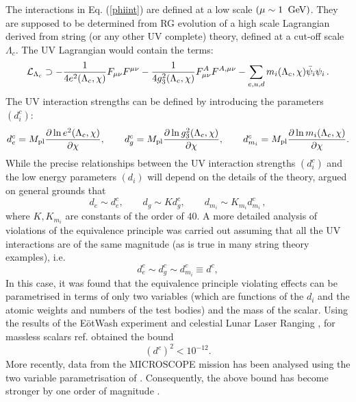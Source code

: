 \documentclass[11pt,a4paper]{article}
\newcommand{\be}{\begin{equation}}
\newcommand{\ee}{\end{equation}}
\def\pref#1{(\ref{#1})}
\begin{document}
The interactions in Eq. \pref{phiint} are defined at a low scale $(\mu \sim 1 \phantom{a} \rm{GeV})$. They are supposed to be
determined from RG evolution of a high scale Lagrangian derived from string (or any other UV complete) theory, defined at a cut-off scale $\Lambda_c$. The UV Lagrangian would contain the terms:
%
\begin{equation}
\label{UVLag}
   \mathcal{L}_{\Lambda_c} \supset   -  {1 \over  {4 e^2(\Lambda_c, \chi)}} F_{\mu \nu} F^{\mu \nu} - {1 \over  {4 g_3^2(\Lambda_c, \chi)}}  F_{\mu \nu}^{A} F^{A, \mu \nu}
   - \sum_{e,u,d}  m_i (\Lambda_c, \chi) \bar{\psi}_i \psi_i \,.   
\end{equation}
%
The UV interaction strengths can be defined by introducing the parameters $(d^c_{i})$:
%
\be
\label{UVint}
  d^{c}_e  = M_{\rm pl} { {\partial \ln e^2(\Lambda_c, \chi)} \over \partial{\chi}},  \qquad
  d^{c}_g  = M_{\rm pl} { {\partial \ln g_3^2(\Lambda_c, \chi)} \over \partial{\chi}},  \qquad
  d^{c}_{m_{i}}  = M_{\rm pl} { {\partial \ln m_{i}(\Lambda_c, \chi)} \over \partial{\chi}}.
\ee
%
While the precise relationships between the UV interaction strengths $(d^{c}_i)$ and the low energy parameters $(d_i)$ will depend on the details of the theory, \cite{Damour:2010rp} argued on general  grounds that
%
\be
\label{rela}
   d_e \sim d_e^c, \qquad d_g \sim K d_g^c , \qquad  d_{m_{i}} \sim K_{m_{i}} d^c_{m_{i}} \,,
 \ee
%
where $K, K_{m_{i}}$ are constants of the order of $40$. A more detailed analysis of violations of the equivalence principle was carried out assuming that all the UV interactions are of the same magnitude 
(as is true in many string theory examples), i.e.
%
$$
  d_e^{c} \sim d_g^c \sim d^c_{m_{i}} \equiv d^c,
$$
%
In this case, it was found that the equivalence principle violating effects can be parametrised in terms of only two variables (which are functions of the $d_i$ and the atomic weights and numbers of the test bodies) and the mass of the scalar. Using the results of the E\"{o}tWash experiment \cite{Schlamminger:2007ht} and celestial Lunar Laser Ranging \cite{Williams:2004qba}, for massless scalars ref. \cite{Damour:2010rp} obtained the bound 
%
\begin{equation}
\label{boundt}
 \left(d^c\right)^2 < 10^{-12}.
\end{equation}
%
More recently, data from the MICROSCOPE mission \cite{Touboul:2017grn} has been analysed using the two variable parametrisation of \cite{Damour:2010rp}. Consequently, the above bound has become stronger by one order of magnitude \cite{Berge:2017ovy}. 
 
\end{document}
